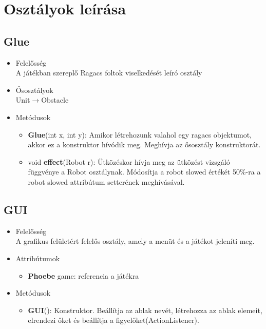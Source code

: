 \section{Osztályok leírása}

\subsection{Glue}
\begin{itemize}
\item Felelősség\\
A játékban szereplő Ragacs foltok viselkedését leíró osztály
\item Ősosztályok\\
Unit$\rightarrow$Obstacle
\item Metódusok
	\begin{itemize}
	    \item \textbf{Glue}(int x, int y): Amikor létrehozunk valahol egy ragacs objektumot, akkor ez a konstruktor hívódik meg. Meghívja az ősosztály konstruktorát.
		\item void \textbf{effect}(Robot r): Ütközéskor hívja meg az ütközést vizsgáló függvénye a Robot osztálynak. Módosítja a robot slowed értékét 50\%-ra a robot slowed attribútum setterének meghívásával.
	\end{itemize}
\end{itemize}

\subsection{GUI}
\begin{itemize}
\item Felelősség\\
A grafikus felületért felelős osztály, amely a menüt és a játékot jeleníti meg.
\item Attribútumok
	\begin{itemize}
		\item \textbf{Phoebe} game: referencia a játékra
	\end{itemize}
\item Metódusok
	\begin{itemize}
		\item\textbf{GUI}(): Konstruktor. Beállítja az ablak nevét, létrehozza az ablak elemeit, elrendezi őket és beállítja a figyelőket(ActionListener).
	\end{itemize}
\end{itemize}


